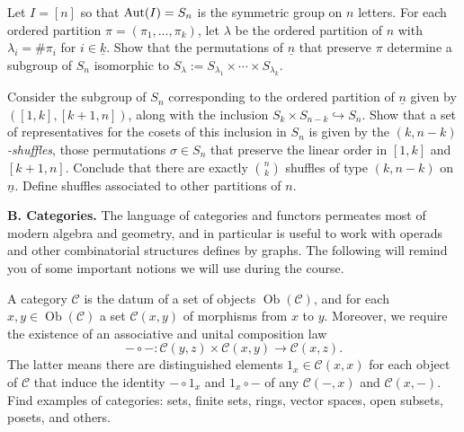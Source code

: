 \begin{question} Let $I = [n]$ so that $\operatorname{Aut}(I) = S_n$ is 
the symmetric group on $n$ letters. For each ordered 
partition $\pi = (\pi_1,\ldots,\pi_k)$, let $\lambda$
be the ordered partition of $n$ with $\lambda_i = \# \pi_i$
for $i\in \underline{k}$. Show that the permutations of
$\underline{n}$ that preserve $\pi$ determine a subgroup of $S_n$
isomorphic to $S_\lambda := S_{\lambda_1}\times
\cdots \times S_{\lambda_k}$. 
\end{question}


\begin{question} Consider the subgroup of $S_n$ corresponding
to the ordered partition of $\underline{n}$ given by $([1,k],[k+1,n])$, along with the 
inclusion $S_k\times S_{n-k} \hookrightarrow S_n$. Show that
a set of representatives for the cosets of this inclusion
in $S_n$ is given by the \emph{$(k,n-k)$-shuffles}, those
permutations $\sigma\in S_n$ that preserve the linear order in
$[1,k]$ and $[k+1,n]$. Conclude that there are exactly
$\binom nk$ shuffles of type $(k,n-k)$ on $\underline{n}$. Define
shuffles associated to other partitions of $n$.
\end{question}

\medskip
\textbf{B. Categories.} The language of categories and
functors permeates most of modern algebra and geometry,
and in particular is useful to work with operads and
other combinatorial structures defines by graphs. The
following will remind you of some important notions
we will use during the course.

\begin{question} A category $\mathcal C$ is the datum of
a set of objects $\operatorname{Ob}(\mathcal{C})$, and
for each $x,y\in \operatorname{Ob}(\mathcal{C})$ a
set $\mathcal C(x,y)$ of morphisms from $x$ to $y$.
Moreover, we require the existence of an associative
and unital composition law
\[-\circ -: \mathcal C(y,z) \times  \mathcal C(x,y) 
	\longrightarrow \mathcal C(x,z). \] 
	The latter means there are distinguished elements
	$1_x\in \mathcal{C}(x,x)$ for each object of $\mathcal{C}$
	that induce the identity $-\circ 1_x$ and $1_x\circ -$
	of any $\mathcal{C}(-,x)$ and $\mathcal{C}(x,-)$.
	Find examples of categories: sets, finite sets,
	rings, vector spaces, open subsets, posets, and 
	others.
\end{question}

